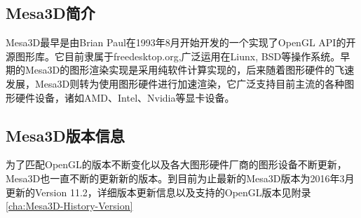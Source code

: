 
\subsection{Mesa3D简介}
Mesa3D最早是由Brian Paul在1993年8月开始开发的一个实现了OpenGL API的开源图形库。它目前隶属于freedesktop.org,广泛运用在Liunx, BSD等操作系统。早期的Mesa3D的图形渲染实现是采用纯软件计算实现的，后来随着图形硬件的飞速发展，Mesa3D则转为使用图形硬件进行加速渲染，它广泛支持目前主流的各种图形硬件设备，诸如AMD、Intel、Nvidia等显卡设备。
\subsection{Mesa3D版本信息}
为了匹配OpenGL的版本不断变化以及各大图形硬件厂商的图形设备不断更新，Mesa3D也一直不断的更新新的版本。到目前为止最新的Mesa3D版本为2016年3月更新的Version 11.2，详细版本更新信息以及支持的OpenGL版本见附录\ref{cha:Mesa3D-History-Version}
